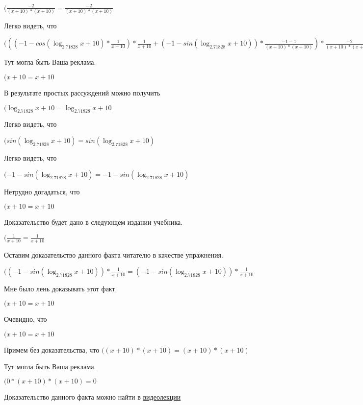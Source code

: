 \documentclass[12pt,a4paper,fleqn]{article}
\theoremstyle{definition}
\begin{document}
$(\frac{ -2 }{( x  +  10 ) * ( x  +  10 )}
 = \frac{ -2 }{( x  +  10 ) * ( x  +  10 )}
$

Легко видеть, что

$((( -1  - cos(\log_{ 2.71828 }{ x  +  10 }) * \frac{ 1 }{ x  +  10 }
) * \frac{ 1 }{ x  +  10 }
 + ( -1  - sin(\log_{ 2.71828 }{ x  +  10 })) * \frac{ -1  -  1 }{( x  +  10 ) * ( x  +  10 )}
) * \frac{ -2 }{( x  +  10 ) * ( x  +  10 )}
 = (( -1  - cos(\log_{ 2.71828 }{ x  +  10 }) * \frac{ 1 }{ x  +  10 }
) * \frac{ 1 }{ x  +  10 }
 + ( -1  - sin(\log_{ 2.71828 }{ x  +  10 })) * \frac{ -1  -  1 }{( x  +  10 ) * ( x  +  10 )}
) * \frac{ -2 }{( x  +  10 ) * ( x  +  10 )}
$

Тут могла быть Ваша реклама.

$( x  +  10  =  x  +  10 $

В результате простых рассуждений можно получить

$(\log_{ 2.71828 }{ x  +  10 } = \log_{ 2.71828 }{ x  +  10 }$

Легко видеть, что

$(sin(\log_{ 2.71828 }{ x  +  10 }) = sin(\log_{ 2.71828 }{ x  +  10 })$

Легко видеть, что

$( -1  - sin(\log_{ 2.71828 }{ x  +  10 }) =  -1  - sin(\log_{ 2.71828 }{ x  +  10 })$

Нетрудно догадаться, что

$( x  +  10  =  x  +  10 $

Доказательство будет дано в следующем издании учебника.

$(\frac{ 1 }{ x  +  10 }
 = \frac{ 1 }{ x  +  10 }
$

Оставим доказательство данного факта читателю в качестве упражнения.

$(( -1  - sin(\log_{ 2.71828 }{ x  +  10 })) * \frac{ 1 }{ x  +  10 }
 = ( -1  - sin(\log_{ 2.71828 }{ x  +  10 })) * \frac{ 1 }{ x  +  10 }
$

Мне было лень доказывать этот факт.

$( x  +  10  =  x  +  10 $

Очевидно, что

$( x  +  10  =  x  +  10 $

Примем без доказательства, что
$(( x  +  10 ) * ( x  +  10 ) = ( x  +  10 ) * ( x  +  10 )$

Тут могла быть Ваша реклама.

$( 0  * ( x  +  10 ) * ( x  +  10 ) =  0 $

Доказательство данного факта можно найти в \href{https://www.youtube.com/watch?v=dQw4w9WgXcQ}{видеолекции}
\end{document}
